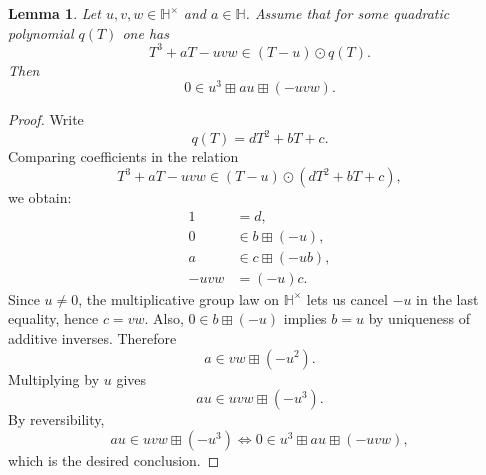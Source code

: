 \documentclass[11pt]{article}
\newtheorem{lemma}[theorem]{Lemma}
\begin{document}
\begin{lemma}\label{lem:root-relation}
Let $u,v,w\in \mathbb H^\times$ and $a\in \mathbb H$.
Assume that for some quadratic polynomial $q(T)$ one has
\[
T^3+aT-uvw \in (T-u)\odot q(T).
\]
Then
\[
0\in u^3\boxplus au\boxplus (-uvw).
\]
\end{lemma}

\begin{proof}
Write
\[
q(T)=dT^2+bT+c.
\]
Comparing coefficients in the relation
\[
T^3+aT-uvw \in (T-u)\odot (dT^2+bT+c),
\]
we obtain:
\begin{align*}
1 &= d,\\
0 &\in b\boxplus (-u),\\
a &\in c\boxplus (-ub),\\
-uvw &= (-u)c.
\end{align*}
Since $u\neq 0$, the multiplicative group law on $\mathbb H^\times$ lets us
cancel $-u$ in the last equality, hence $c=vw$.
Also, $0\in b\boxplus (-u)$ implies $b=u$ by uniqueness of additive inverses.
Therefore
\[
a\in vw\boxplus (-u^2).
\]
Multiplying by $u$ gives
\[
au\in uvw\boxplus (-u^3).
\]
By reversibility,
\[
au\in uvw\boxplus (-u^3)
\iff
0\in u^3\boxplus au\boxplus (-uvw),
\]
which is the desired conclusion.
\end{proof}
\end{document}
